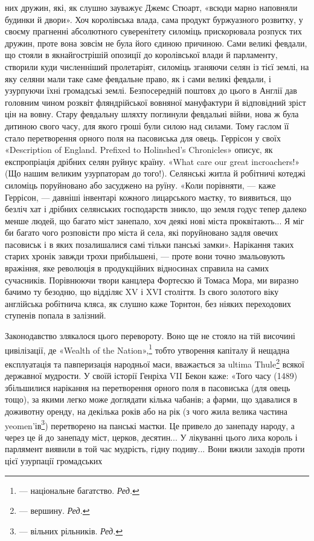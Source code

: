 них дружин, які, як слушно зауважує Джемс Стюарт, «всюди
марно наповняли будинки й двори». Хоч королівська влада,
сама продукт буржуазного розвитку, у своєму прагненні абсолютного
суверенітету силоміць прискорювала розпуск тих дружин,
проте вона зовсім не була його єдиною причиною. Сами
великі февдали, що стояли в якнайгострішій опозиції до королівської
влади й парламенту, створили куди численніший пролетаріят,
силоміць зганяючи селян із тієї землі, на яку селяни
мали таке саме февдальне право, як і сами великі февдали, і
узурпуючи їхні громадські землі. Безпосередній поштовх до цього
в Англії дав головним чином розквіт фляндрійської вовняної
мануфактури й відповідний зріст цін на вовну. Стару февдальну
шляхту поглинули февдальиі війни, нова ж була дитиною свого
часу, для якого гроші були силою над силами. Тому гаслом її
стало перетворення орного поля на пасовиська для овець. Геррісон
у своїх «Description of England. Prefixed to Holinshed’s
Chronicles» описує, як експропріація дрібних селян руйнує
країну. «What care our great incroachers!» (Що нашим великим
узурпаторам до того!). Селянські житла й робітничі котеджі
силоміць поруйновано або засуджено на руїну. «Коли порівняти, —
каже Геррісон, — давніші інвентарі кожного лицарського маєтку,
то виявиться, що безліч хат і дрібних селянських господарств
зникло, що земля годує тепер далеко менше людей, що багато
міст занепало, хоч деякі нові міста проквітають... Я міг би багато
чого розповісти про міста й села, які поруйновано задля
овечих пасовиськ і в яких позалишалися самі тільки панські
замки». Нарікання таких старих хронік завжди трохи прибільшені,
— проте вони точно змальовують вражіння, яке революція
в продукційних відносинах справила на самих сучасників.
Порівнюючи твори канцлера Фортескю й Томаса Мора, ми виразно
бачимо ту безодню, що відділяє XV і XVI століття. Із свого
золотого віку англійська робітнича кляса, як слушно каже Торнтон,
без ніяких переходових ступенів попала в залізний.

Законодавство злякалося цього перевороту. Воно ще не
стояло на тій височині цивілізації, де «Wealth of the Nation»,\footnote*{
— національне багатство. \emph{Ред.}
}
тобто утворення капіталу й нещадна експлуатація та павперизація
народньої маси, вважається за ultima Thule\footnote*{
— вершину. \emph{Ред.}
} всякої державної
мудрости. У своїй історії Генріха VII Бекон каже: «Того
часу (1489) збільшилися нарікання на перетворення орного поля
в пасовиська (для овець тощо), за якими легко може доглядати
кілька чабанів; а фарми, що здавалися в доживотну оренду, на декілька
років або на рік (з чого жила велика частина yeomen’ів\footnote*{
— вільних рільників. \emph{Ред.}
})
перетворено на панські маєтки. Це привело до занепаду народу,
а через це й до занепаду міст, церков, десятин... У лікуванні
цього лиха король і парлямент виявили в той час мудрість, гідну
подиву... Вони вжили заходів проти цієї узурпації громадських